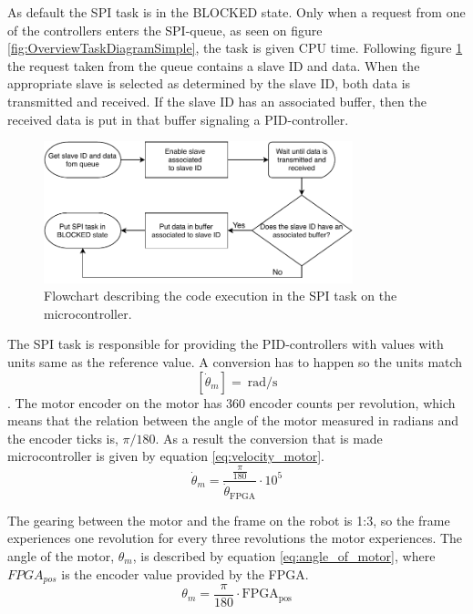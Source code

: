 \documentclass[../../main.tex]{subfiles}
\begin{document}
As default the SPI task is in the BLOCKED state. Only when a request from one of the controllers enters the SPI-queue, as seen on figure \ref{fig:OverviewTaskDiagramSimple}, the task is given CPU time. Following figure \ref{fig:SPIFlowchart} the request taken from the queue contains a slave ID and data. When the appropriate slave is selected as determined by the slave ID, both data is transmitted and received. If the slave ID has an associated buffer, then the received data is put in that buffer signaling a PID-controller.  

\begin{figure}[H]
    \centering
    \includegraphics[width=0.8\textwidth]{Sections/System_Implementation/Images/SPIFlowchart.pdf}
    \caption{Flowchart describing the code execution in the SPI task on the microcontroller.}
    \label{fig:SPIFlowchart}
\end{figure}

The SPI task is responsible for providing the PID-controllers with values with units same as the reference value. A conversion has to happen so the units match \[ \left[ \dot{\theta}_m \right] = \SI{}{\radian \per \second } \]. The motor encoder on the motor has 360 encoder counts per revolution, which means that the relation between the angle of the motor measured in radians and the encoder ticks is, $\pi / 180$. As a result the conversion that is made microcontroller is given by equation \ref{eq:velocity_motor}.
\begin{equation}\label{eq:velocity_motor}
    \dot{\theta}_{m} = \frac{\frac{\pi}{180}}{ \dot{\theta}_{\mathrm{FPGA}} }\cdot 10^{5}
\end{equation}


The gearing between the motor and the frame on the robot is 1:3, so the frame experiences one revolution for every three revolutions the motor experiences. The angle of the motor, $ \theta_{m} $, is described by equation \ref{eq:angle_of_motor}, where $FPGA_{pos}$ is the encoder value provided by the FPGA.
\begin{equation}\label{eq:angle_of_motor}
     \theta_{m} = \frac{\pi}{180} \cdot \mathrm{FPGA_{pos}}
\end{equation}
\end{document}
